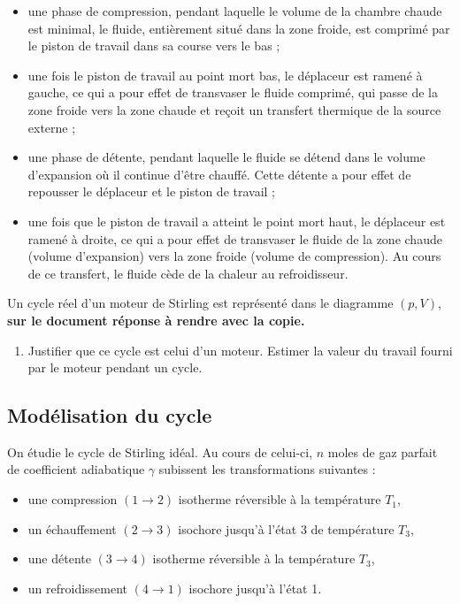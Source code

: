 \documentclass[a4paper, 12pt, garamond]{book}
\begin{document}
\begin{itemize}
	\item
	      une phase de compression, pendant laquelle le volume de la chambre
	      chaude est minimal, le fluide, entièrement situé dans la zone froide,
	      est comprimé par le piston de travail dans sa course vers le bas ;
	\item
	      une fois le piston de travail au point mort bas, le déplaceur est
	      ramené à gauche, ce qui a pour effet de transvaser le fluide comprimé,
	      qui passe de la zone froide vers la zone chaude et reçoit un transfert
	      thermique de la source externe ;
	\item
	      une phase de détente, pendant laquelle le fluide se détend dans le
	      volume d'expansion où il continue d'être chauffé. Cette détente a pour
	      effet de repousser le déplaceur et le piston de travail ;
	\item
	      une fois que le piston de travail a atteint le point mort haut, le
	      déplaceur est ramené à droite, ce qui a pour effet de transvaser le
	      fluide de la zone chaude (volume d'expansion) vers la zone froide
	      (volume de compression). Au cours de ce transfert, le fluide cède de
	      la chaleur au refroidisseur.
\end{itemize}

Un cycle réel d'un moteur de Stirling est représenté dans le diagramme
\((p,V)\), \textbf{sur le document réponse à rendre avec la copie.}

\begin{enumerate}
	\item
	      Justifier que ce cycle est celui d'un moteur. Estimer la valeur du
	      travail fourni par le moteur pendant un cycle.
\end{enumerate}

\subsection{Modélisation du cycle}

On étudie le cycle de Stirling idéal. Au cours de celui-ci, \(n\) moles
de gaz parfait de coefficient adiabatique \(\gamma\) subissent les
transformations suivantes :

\begin{itemize}
	\item
	      une compression \((1 \to 2)\) isotherme réversible à la température
	      \(T_1\),
	\item
	      un échauffement \((2 \to 3)\) isochore jusqu'à l'état 3 de température
	      \(T_3\),
	\item
	      une détente \((3 \to 4)\) isotherme réversible à la température
	      \(T_3\),
	\item
	      un refroidissement \((4 \to 1)\) isochore jusqu'à l'état 1.
\end{itemize}
\end{document}
